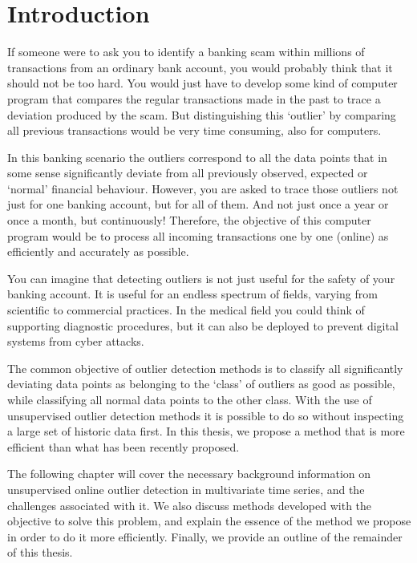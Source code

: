 \chapter{Introduction}
\label{chap:introduction}

If someone were to ask you to identify a banking scam within millions of transactions from an ordinary bank account, you would probably think that it should not be too hard. You would just have to develop some kind of computer program that compares the regular transactions made in the past to trace a deviation produced by the scam. But distinguishing this `outlier' by comparing all previous transactions would be very time consuming, also for computers.

In this banking scenario the outliers correspond to all the data points that in some sense significantly deviate from all previously observed, expected or `normal' financial behaviour. However, you are asked to trace those outliers not just for one banking account, but for all of them. And not just once a year or once a month, but continuously! Therefore, the objective of this computer program would be to process all incoming transactions one by one (online) as efficiently and accurately as possible.

You can imagine that detecting outliers is not just useful for the safety of your banking account. It is useful for an endless spectrum of fields, varying from scientific to commercial practices. In the medical field you could think of supporting diagnostic procedures, but it can also be deployed to prevent digital systems from cyber attacks.

The common objective of outlier detection methods is to classify all significantly deviating data points as belonging to the `class' of outliers as good as possible, while classifying all normal data points to the other class. With the use of unsupervised outlier detection methods it is possible to do so without inspecting a large set of historic data first. 
In this thesis, we propose a method that is more efficient than what has been recently proposed.

The following chapter will cover the necessary background information on unsupervised online outlier detection in multivariate time series, and the challenges associated with it.
We also discuss methods developed with the objective to solve this problem, and explain the essence of the method we propose in order to do it more efficiently. Finally, we provide an outline of the remainder of this thesis.



